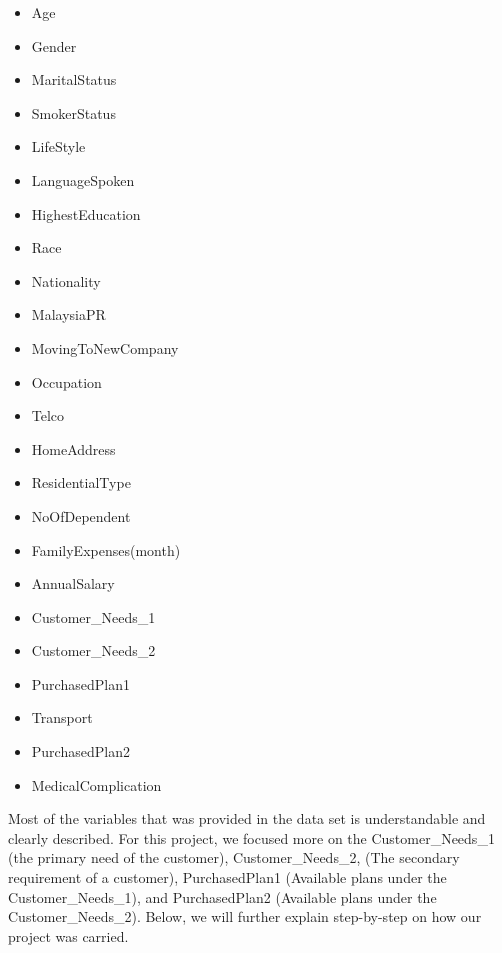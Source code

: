 \documentclass[11pt]{article}
\begin{document}
\begin{multicols}{2}
\begin{itemize}
    \item Age
    \item Gender
    \item MaritalStatus
    \item SmokerStatus
    \item LifeStyle
    \item LanguageSpoken
    \item HighestEducation
    \item Race
    \item Nationality
    \item MalaysiaPR
    \item MovingToNewCompany
    \item Occupation
\end{itemize}
 \columnbreak
\begin{itemize}
   
    \item Telco
    \item HomeAddress
    \item ResidentialType
    \item NoOfDependent
    \item FamilyExpenses(month)	
    \item AnnualSalary
    \item Customer\_Needs\_1
    \item Customer\_Needs\_2
    \item PurchasedPlan1
    \item Transport
    \item PurchasedPlan2
    \item MedicalComplication

\end{itemize}
\end{multicols}
\textrm{\hspace{1cm}Most of the variables that was provided in the data set is understandable and clearly described. For this project, we focused more on the Customer\_Needs\_1 (the primary need of the customer), Customer\_Needs\_2, (The secondary requirement of a customer), PurchasedPlan1 (Available plans under the Customer\_Needs\_1), and PurchasedPlan2 (Available plans under the Customer\_Needs\_2). Below, we will further explain step-by-step on how our project was carried.}


\vspace{1.0\baselineskip} 
\end{document}
